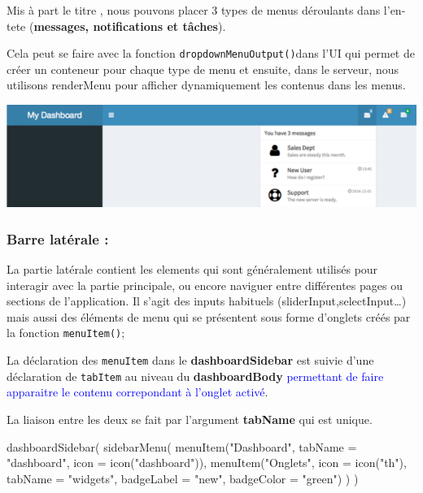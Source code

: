 \documentclass[
]{article}
\newenvironment{Shaded}{\begin{snugshade}}{\end{snugshade}}
\newcommand{\AttributeTok}[1]{\textcolor[rgb]{0.77,0.63,0.00}{#1}}
\newcommand{\FunctionTok}[1]{\textcolor[rgb]{0.00,0.00,0.00}{#1}}
\newcommand{\NormalTok}[1]{#1}
\newcommand{\StringTok}[1]{\textcolor[rgb]{0.31,0.60,0.02}{#1}}
\begin{document}
Mis à part le titre , nous pouvons placer 3 types de menus déroulants
dans l'en-tete (\textbf{messages, notifications et tâches}).

Cela peut se faire avec la fonction \texttt{dropdownMenuOutput()}dans
l'UI qui permet de créer un conteneur pour chaque type de menu et
ensuite, dans le serveur, nous utilisons renderMenu pour afficher
dynamiquement les contenus dans les menus.

\includegraphics{images/clipboard-342847202.png}

\hypertarget{barre-latuxe9rale}{%
\subsubsection{Barre latérale :}\label{barre-latuxe9rale}}

La partie latérale contient les elements qui sont généralement utilisés
pour interagir avec la partie principale, ou encore naviguer entre
différentes pages ou sections de l'application. Il s'agit des inputs
habituels (sliderInput,selectInput\ldots) mais aussi des éléments de
menu qui se présentent sous forme d'onglets créés par la fonction
\texttt{menuItem()};

La déclaration des \texttt{menuItem} dans le \textbf{dashboardSidebar}
est suivie d'une déclaration de \texttt{tabItem} au niveau du
\textbf{dashboardBody}
\textcolor{blue}{permettant de faire apparaitre le contenu correpondant à l'onglet activé}.

La liaison entre les deux se fait par l'argument \textbf{tabName} qui
est unique.

\begin{Shaded}
\begin{Highlighting}[]
\FunctionTok{dashboardSidebar}\NormalTok{(}
  \FunctionTok{sidebarMenu}\NormalTok{(}
    \FunctionTok{menuItem}\NormalTok{(}\StringTok{"Dashboard"}\NormalTok{, }\AttributeTok{tabName =} \StringTok{"dashboard"}\NormalTok{, }\AttributeTok{icon =} \FunctionTok{icon}\NormalTok{(}\StringTok{"dashboard"}\NormalTok{)),}
    \FunctionTok{menuItem}\NormalTok{(}\StringTok{"Onglets"}\NormalTok{, }\AttributeTok{icon =} \FunctionTok{icon}\NormalTok{(}\StringTok{"th"}\NormalTok{), }\AttributeTok{tabName =} \StringTok{"widgets"}\NormalTok{,}
             \AttributeTok{badgeLabel =} \StringTok{"new"}\NormalTok{, }\AttributeTok{badgeColor =} \StringTok{"green"}\NormalTok{)}
\NormalTok{  )}
\NormalTok{)}
\end{Highlighting}
\end{Shaded}
\end{document}
